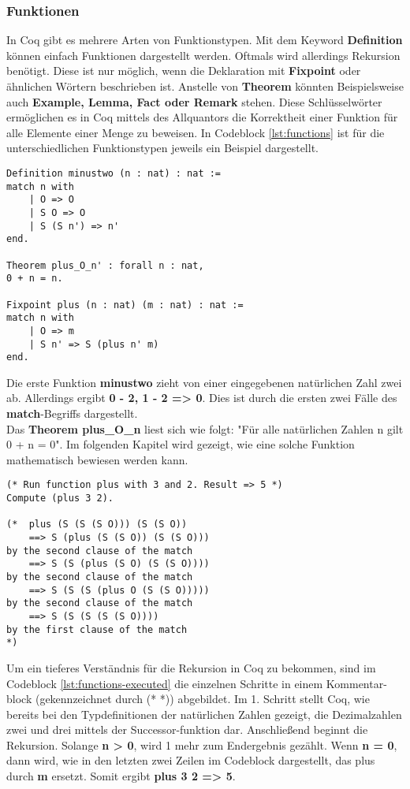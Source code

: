 \subsubsection{Funktionen}
In Coq gibt es mehrere Arten von Funktionstypen. Mit dem Keyword \textbf{Definition} können einfach Funktionen dargestellt werden. Oftmals wird allerdings Rekursion benötigt. Diese ist nur möglich, wenn die Deklaration mit \textbf{Fixpoint} oder ähnlichen Wörtern beschrieben ist. Anstelle von \textbf{Theorem} könnten Beispielsweise auch \textbf{Example, Lemma, Fact oder Remark} stehen. Diese Schlüsselwörter ermöglichen es in Coq mittels des Allquantors die Korrektheit einer Funktion für alle Elemente einer Menge zu beweisen.
In Codeblock \ref{lst:functions} ist für die unterschiedlichen Funktionstypen jeweils ein Beispiel dargestellt.
\begin{lstlisting}[language=coq,firstnumber=1,caption=Coq Funktionen,label=lst:functions]
Definition minustwo (n : nat) : nat :=
match n with
	| O => O
	| S O => O
	| S (S n') => n'
end.

Theorem plus_O_n' : forall n : nat,
0 + n = n.

Fixpoint plus (n : nat) (m : nat) : nat :=
match n with
	| O => m
	| S n' => S (plus n' m)
end.
\end{lstlisting}

Die erste Funktion \textbf{minustwo} zieht von einer eingegebenen natürlichen Zahl zwei ab. Allerdings ergibt \textbf{0 - 2, 1 - 2 => 0}. Dies ist durch die ersten zwei Fälle des \textbf{match}-Begriffs dargestellt.\\
Das \textbf{Theorem plus\_O\_n} liest sich wie folgt: "Für alle natürlichen Zahlen n gilt 0 + n = 0". Im folgenden Kapitel wird gezeigt, wie eine solche Funktion mathematisch bewiesen werden kann.

\begin{lstlisting}[language=coq,firstnumber=1,caption=Coq rekursive Funktion,label=lst:functions-executed]
(* Run function plus with 3 and 2. Result => 5 *)
Compute (plus 3 2).

(*  plus (S (S (S O))) (S (S O))
	==> S (plus (S (S O)) (S (S O)))
by the second clause of the match
	==> S (S (plus (S O) (S (S O))))
by the second clause of the match
	==> S (S (S (plus O (S (S O)))))
by the second clause of the match
	==> S (S (S (S (S O))))
by the first clause of the match
*)
\end{lstlisting}
Um ein tieferes Verständnis für die Rekursion in Coq zu bekommen, sind im Codeblock \ref{lst:functions-executed} die einzelnen Schritte in einem Kommentar-block (gekennzeichnet durch (* *)) abgebildet. Im 1. Schritt stellt Coq, wie bereits bei den Typdefinitionen der natürlichen Zahlen gezeigt, die Dezimalzahlen zwei und drei mittels der Successor-funktion dar. Anschließend beginnt die Rekursion. Solange \textbf{n > 0}, wird 1 mehr zum Endergebnis gezählt. Wenn \textbf{n = 0}, dann wird, wie in den letzten zwei Zeilen im Codeblock dargestellt, das plus durch \textbf{m} ersetzt. Somit ergibt \textbf{plus 3 2 => 5}.


